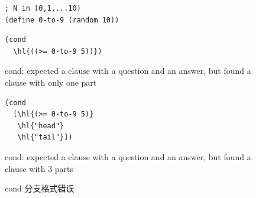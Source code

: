 \begin{figure}[htbp]
  \centering
\begin{stepperbox}[unbreakable]
\begin{Verbatim}[fontsize=\footnotesize]
; N in [0,1,...10)
(define 0-to-9 (random 10))
\end{Verbatim}
\noindent\begin{minipage}[c]{0.46\linewidth}
\begin{Verbatim}[commandchars=\\\{\}, fontsize=\footnotesize]
(cond
  \hl{((>= 0-to-9 5))})
\end{Verbatim}
\end{minipage}\hfill
\begin{minipage}[c]{0.50\linewidth}\footnotesize\sffamily\raggedright
cond: expected a clause with a question and an answer, but found a clause with only one part
\end{minipage}
\end{stepperbox}
\begin{stepperbox}[unbreakable]
\noindent\begin{minipage}[c]{0.46\linewidth}
\begin{Verbatim}[commandchars=\\\{\}, fontsize=\footnotesize]
(cond
  [\hl{(>= 0-to-9 5)}
   \hl{"head"}
   \hl{"tail"}])
\end{Verbatim}
\end{minipage}\hfill
\begin{minipage}[c]{0.50\linewidth}\footnotesize\sffamily\raggedright
cond: expected a clause with a question and an answer, but found a clause with 3 parts
\end{minipage}
\end{stepperbox}
  \caption{cond 分支格式错误}
  \label{fig:err_cond_shape}
\end{figure}

